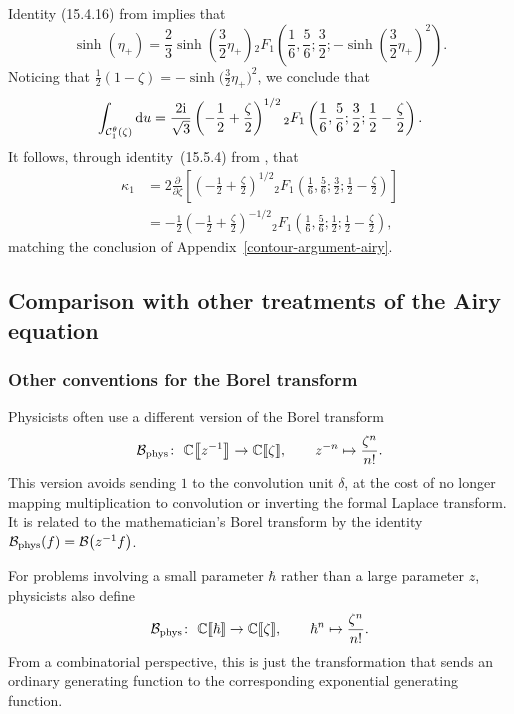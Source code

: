 \documentclass[10pt,a4paper]{amsart}
\newcommand{\maps}{\colon}
\newcommand{\C}{\mathbb{C}}
\newcommand{\borel}{\mathcal{B}}
\numberwithin{equation}{section}
\begin{document}
Identity (15.4.16) from \cite{dlmf} implies that
\[ \sinh(\eta_+) = \frac{2}{3} \sinh\left(\frac{3}{2}\eta_+\right) {}_2 F_1\left(\frac{1}{6}, \frac{5}{6}; \frac{3}{2}; -\sinh\left(\frac{3}{2}\eta_+\right)^2\right). \]
Noticing that $\frac{1}{2}(1 - \zeta) = -\sinh\bigl(\frac{3}{2}\eta_+\bigr)^2$, we conclude that
\[ \int_{\mathcal{C}_1^\theta(\zeta)} {\rm d}u = \frac{2{\rm i}}{\sqrt{3}} \left(-\frac{1}{2} + \frac{\zeta}{2}\right)^{1/2} {}_2 F_1\left(\frac{1}{6}, \frac{5}{6}; \frac{3}{2}; \frac{1}{2} - \frac{\zeta}{2}\right). \]
It follows, through identity~(15.5.4) from \cite{dlmf}, that
\begin{align*}
\kappa_1 & = 2 \frac{\partial}{\partial \zeta} \left[ \left(-\frac{1}{2} + \frac{\zeta}{2}\right)^{1/2} {}_2 F_1\left(\frac{1}{6}, \frac{5}{6}; \frac{3}{2}; \frac{1}{2} - \frac{\zeta}{2}\right) \right] \\
& = -\frac{1}{2} \left(-\frac{1}{2} + \frac{\zeta}{2}\right)^{-1/2} {}_2 F_1\left(\frac{1}{6}, \frac{5}{6}; \frac{1}{2}; \frac{1}{2} - \frac{\zeta}{2}\right),
\end{align*}
matching the conclusion of Appendix~\ref{contour-argument-airy}.
%
\subsection{Comparison with other treatments of the Airy equation}\label{airy-comparison}
%
\subsubsection{Other conventions for the Borel transform}
%
Physicists often use a different version of the Borel transform
\begin{align*}
\borel_{{\rm phys}} \maps \ \C \big\llbracket z^{-1} \big\rrbracket \to \C \llbracket \zeta \rrbracket ,\qquad
z^{-n} \mapsto \frac{\zeta^n}{n!}.
\end{align*}
This version avoids sending $1$ to the convolution unit $\delta$, at the cost of no longer mapping multiplication to convolution or inverting the formal Laplace transform. It is related to the mathematician's Borel transform by the identity $\borel_{\rm phys}(f) = \borel\bigl(z^{-1} f\bigr)$.

For problems involving a small parameter $\hbar$ rather than a large parameter $z$, physicists also define
\begin{align*}
\borel_{{\rm phys}} \maps\ \C \llbracket \hbar \rrbracket \to \C \llbracket \zeta \rrbracket ,\qquad
\hbar^n \mapsto \frac{\zeta^n}{n!}.
\end{align*}
From a combinatorial perspective, this is just the transformation that sends an ordinary generating function to the corresponding exponential generating function.
\end{document}
